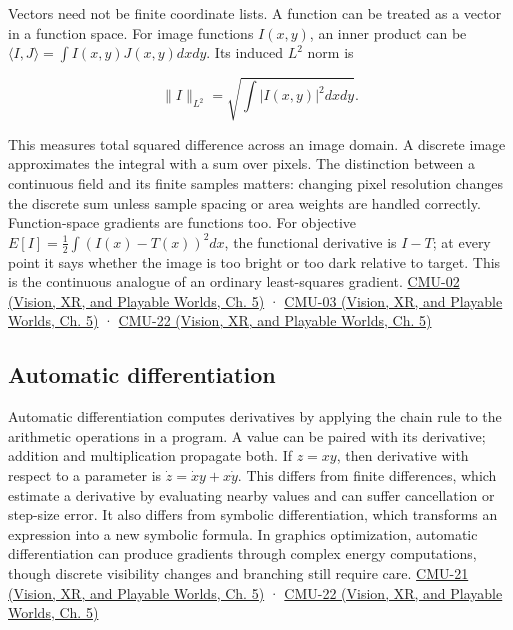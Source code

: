 Vectors need not be finite coordinate lists. A function can be treated as a vector in a function space. For image functions \(I(x,y)\), an inner product can be \(\langle I,J\rangle=\int I(x,y)J(x,y)dxdy\). Its induced \(L^2\) norm is

\[
\|I\|_{L^2}=\sqrt{\int |I(x,y)|^2dxdy}.
\]

This measures total squared difference across an image domain. A discrete image approximates the integral with a sum over pixels. The distinction between a continuous field and its finite samples matters: changing pixel resolution changes the discrete sum unless sample spacing or area weights are handled correctly. Function-space gradients are functions too. For objective \(E[I]=\tfrac12\int (I(x)-T(x))^2dx\), the functional derivative is \(I-T\); at every point it says whether the image is too bright or too dark relative to target. This is the continuous analogue of an ordinary least-squares gradient. \href{../07-Vision-XR-and-Playable-Worlds/main.pdf\#nameddest=04-visual-computing-ii-ch036-cmu-02---linear-algebra-preview}{CMU-02 (Vision, XR, and Playable Worlds, Ch. 5)} · \href{../07-Vision-XR-and-Playable-Worlds/main.pdf\#nameddest=04-visual-computing-ii-ch036-cmu-03---vector-calculus-preview}{CMU-03 (Vision, XR, and Playable Worlds, Ch. 5)} · \href{../07-Vision-XR-and-Playable-Worlds/main.pdf\#nameddest=04-visual-computing-ii-ch036-cmu-22---optimization}{CMU-22 (Vision, XR, and Playable Worlds, Ch. 5)}

\subsection{Automatic differentiation}\label{04-visual-computing-ii-ch029-automatic-differentiation}

\hypertarget{04-visual-computing-ii-ch029-automatic-differentiation}{}

Automatic differentiation computes derivatives by applying the chain rule to the arithmetic operations in a program. A value can be paired with its derivative; addition and multiplication propagate both. If \(z=xy\), then derivative with respect to a parameter is \(\dot z=\dot x y+x\dot y\). This differs from finite differences, which estimate a derivative by evaluating nearby values and can suffer cancellation or step-size error. It also differs from symbolic differentiation, which transforms an expression into a new symbolic formula. In graphics optimization, automatic differentiation can produce gradients through complex energy computations, though discrete visibility changes and branching still require care. \href{../07-Vision-XR-and-Playable-Worlds/main.pdf\#nameddest=04-visual-computing-ii-ch036-cmu-21---dynamics-and-time-integration}{CMU-21 (Vision, XR, and Playable Worlds, Ch. 5)} · \href{../07-Vision-XR-and-Playable-Worlds/main.pdf\#nameddest=04-visual-computing-ii-ch036-cmu-22---optimization}{CMU-22 (Vision, XR, and Playable Worlds, Ch. 5)}

